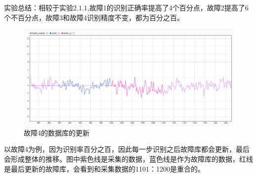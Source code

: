 \documentclass[lang=cn,11pt,a4paper]{elegantpaper}
\begin{document}
实验总结：相较于实验$\boldsymbol{2.1.1}$,故障1的识别正确率提高了4个百分点，故障2提高了6个不百分点，故障3和故障4识别精度不变，都为百分之百。
\begin{figure}[H] %
	\centering %
	\includegraphics[width=1.0\textwidth]{exp2_5} %
	\caption{故障4的数据库的更新} %
	\label{Fig.main2} %
\end{figure}
以故障4为例，因为识别率百分之百，因此每一步识别之后故障库都会更新，最后会形成整体的推移。图中紫色线是采集的数据，蓝色线是作为故障库的数据，红线是最后更新的故障库，会看到和采集数据的1101：1200是重合的。
\end{document}
